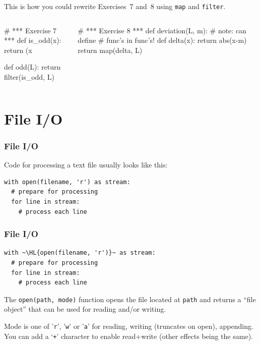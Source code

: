 \documentclass[english,serif,mathserif,xcolor=pdftex,dvipsnames,table]{beamer}
\begin{document}
\begin{frame}[fragile]
  This is how you could rewrite Exercises~7 and~8 using \texttt{map} and
  \texttt{filter}.

  \begin{columns}
    \begin{column}{0.5\linewidth}
\begin{python}
# *** Exercise 7 ***
def is_odd(x):
  return (x %

def odd(L):
  return filter(is_odd, L)
\end{python}
\end{column}
\begin{column}{0.5\linewidth}
\begin{python}
# *** Exercise 8 ***
def deviation(L, m):
  # note: can define
  # func's in func's!
  def delta(x):
    return abs(x-m)
  return map(delta, L)
\end{python}
\end{column}
  \end{columns}
\end{frame}

\section{File I/O}

\begin{frame}[fragile]
  \frametitle{File I/O}

  Code for processing a text file usually looks like this:
\begin{lstlisting}
with open(filename, 'r') as stream:
  # prepare for processing
  for line in stream:
    # process each line
\end{lstlisting}
\end{frame}


\begin{frame}[fragile]
  \frametitle{File I/O}

\begin{lstlisting}
with ~\HL{open(filename, 'r')}~ as stream:
  # prepare for processing
  for line in stream:
    # process each line
\end{lstlisting}

  \+ The \lstinline|open(path, mode)| function opens the file located at
  \texttt{path} and returns a ``file object'' that can be used for reading
  and/or writing.

  \+ Mode is one of '\texttt{r}', '\texttt{w}' or '\texttt{a}' for reading,
  writing (truncates on open), appending. You can add a `\texttt{+}' character
  to enable read+write (other effects being the same).
\end{frame}
\end{document}
